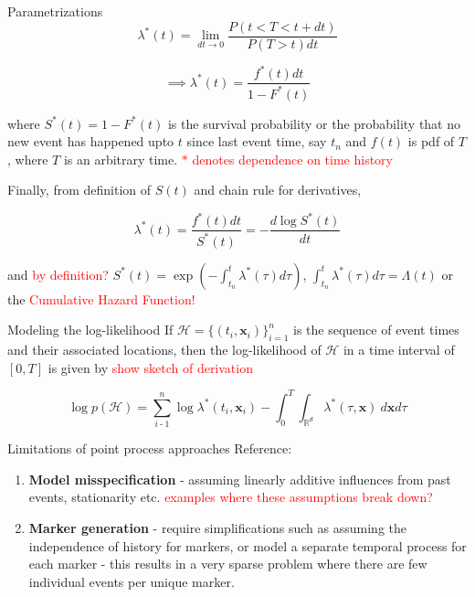 \documentclass{beamer}
\begin{document}
\begin{frame}{Parametrizations}
    $$\lambda^{\ast}(t) = \lim_{dt \rightarrow 0} \frac{P(t < T < t + dt)}{P (T > t)dt}$$

    $$\implies \lambda^{\ast}(t) = \frac{f^{\ast}(t)dt}{1 - F^{\ast}(t)}$$

    where $S^{\ast}(t) = 1 - F^{\ast}(t)$ is the survival probability or the probability that no new event has happened upto $t$ since last event time, say $t_n$ and $f(t)$ is pdf of $T$, where $T$ is an arbitrary time. \textcolor{red}{$\ast$ denotes dependence on time history}

    Finally, from definition of $S(t)$ and chain rule for derivatives, 

    $$\lambda^{\ast}(t) = \frac{f^{\ast}(t)dt}{S^{\ast}(t)} = - \frac{d \log S^{\ast}(t)}{dt}$$

    and \textcolor{red}{by definition?} $S^{\ast}(t) = \exp \left( - \int_{t_n}^{t} \lambda^{\ast}(\tau) d\tau \right)$, $\int_{t_n}^{t} \lambda^{\ast}(\tau) d\tau = \Lambda(t)$ or the \textcolor{red}{Cumulative Hazard Function!}
\end{frame}

\begin{frame}{Modeling the log-likelihood}
If $\mathcal{H}=\{(t_i,\boldsymbol{x}_i)\}_{i=1}^n$ is the sequence of event times and their associated locations, 
then the log-likelihood of $\mathcal{H}$ in a time interval of $[0, T]$ is given by \textcolor{red}{show sketch of derivation}

\begin{equation*}
    \log p\left(\mathcal{H}\right)=\sum_{i\operatorname{-}1}^n\log\lambda^*(t_i,\boldsymbol{x}_i)-\int_0^T\int_{\mathbb{R}^d}\lambda^*(\tau,\boldsymbol{x})\mathrm{~}d\boldsymbol{x}d\tau 
\end{equation*}
\end{frame}

\begin{frame}{Limitations of point process approaches}
    Reference:  \cite{Nan2016}
    \begin{enumerate}
        \item \textbf{Model misspecification} - assuming linearly additive influences from past events, stationarity etc. \textcolor{red}{examples where these assumptions break down?}

        \item \textbf{Marker generation} - require simplifications such as assuming the independence of history for markers, or model a separate temporal process for each marker - this results in a very sparse problem where there are few individual events per unique marker.
    \end{enumerate}
\end{frame}
\end{document}
